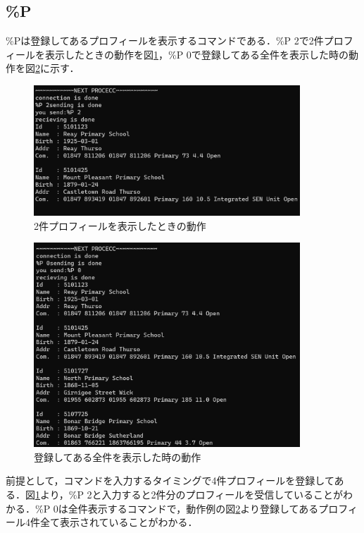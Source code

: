 \documentclass[11pt,a4j,titlepage]{jsarticle}
\begin{document}
\subsection{\%P}
\%Pは登録してあるプロフィールを表示するコマンドである．\%P 2で2件プロフィールを表示したときの動作を図\ref{fig:p2}，\%P 0で登録してある全件を表示した時の動作を図\ref{fig:p0}に示す．
\begin{figure}[h]
\centering
\includegraphics[width=10cm]{pics/p2.png}
\caption{2件プロフィールを表示したときの動作}
\label{fig:p2}\vspace{0zh}
\end{figure}
\begin{figure}[h]
\centering
\includegraphics[width=10cm]{pics/p0.png}
\caption{登録してある全件を表示した時の動作}
\label{fig:p0}\vspace{0zh}
\end{figure}

前提として，コマンドを入力するタイミングで4件プロフィールを登録してある．図\ref{fig:p2}より，\%P 2と入力すると2件分のプロフィールを受信していることがわかる．\%P 0は全件表示するコマンドで，動作例の図\ref{fig:p0}より登録してあるプロフィール4件全て表示されていることがわかる．
\end{document}

